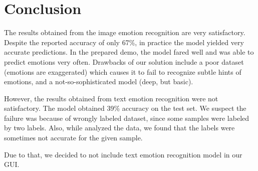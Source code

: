 \documentclass{ledger}
\begin{document}
\section{Conclusion}

The results obtained from the image emotion recognition are very satisfactory. Despite the reported accuracy of only 67\%, in practice the model yielded very accurate predictions. In the prepared demo, the model fared well and was able to predict emotions very often. Drawbacks of our solution include a poor dataset (emotions are exaggerated) which causes it to fail to recognize subtle hints of emotions, and a not-so-sophisticated model (deep, but basic).

\hfill

However, the results obtained from text emotion recognition were not satisfactory. The model obtained 39\% accuracy on the test set. We suspect the failure was because of wrongly labeled dataset, since some samples were labeled by two labels. Also, while analyzed the data, we found that the labels were sometimes not accurate for the given sample.

Due to that, we decided to not include text emotion recognition model in our GUI.




\end{document}
